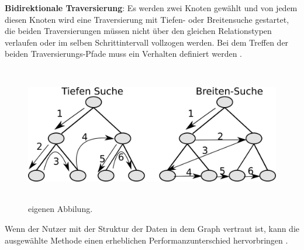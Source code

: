 \textbf {Bidirektionale Traversierung}: Es werden zwei Knoten gewählt und von jedem diesen Knoten wird eine Traversierung  mit Tiefen- oder Breitensuche gestartet, die beiden Traversierungen müssen nicht über den gleichen Relationstypen verlaufen oder im selben Schrittintervall vollzogen werden. Bei dem Treffen der beiden Traversierungs-Pfade muss ein Verhalten definiert werden .
\FloatBarrier
\begin{figure}[!htb]
	\centering
	\includegraphics [width=14cm, height=6cm]{Figures/New_Search.png}
	\caption[Breiten- und Tiefensuche]{ eigenen Abbilung.}
	\label{fig:Search}
\end{figure} 
\FloatBarrier
\noindent Wenn der Nutzer mit der Struktur der Daten in dem Graph vertraut ist, kann die ausgewählte Methode einen erheblichen Performanzunterschied hervorbringen \parencite{vukotic2015neo4j}. 

